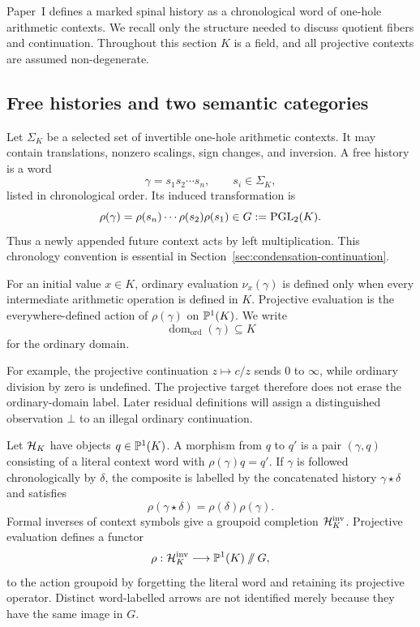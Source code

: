 Paper~I defines a marked spinal history as a chronological word of one-hole
arithmetic contexts.  We recall only the structure needed to discuss quotient
fibers and continuation.  Throughout this section $K$ is a field, and all
projective contexts are assumed non-degenerate.

\subsection{Free histories and two semantic categories}

Let $\Sigma_K$ be a selected set of invertible one-hole arithmetic contexts.
It may contain translations, nonzero scalings, sign changes, and inversion.
A free history is a word
\[
  \gamma=s_1s_2\cdots s_n,
  \qquad s_i\in\Sigma_K,
\]
listed in chronological order.  Its induced transformation is
\begin{equation}
  \rho(\gamma)=\rho(s_n)\cdots\rho(s_2)\rho(s_1)
  \in G:=\operatorname{PGL}_2(K).
  \label{eq:chronological-evaluation}
\end{equation}
Thus a newly appended future context acts by left multiplication.  This
chronology convention is essential in Section~\ref{sec:condensation-continuation}.

\begin{definition}
For an initial value $x\in K$, ordinary evaluation $\nu_x(\gamma)$ is defined
only when every intermediate arithmetic operation is defined in $K$.
Projective evaluation is the everywhere-defined action of $\rho(\gamma)$ on
$\mathbb{P}^1(K)$.  We write
\[
  \operatorname{dom}_{\mathrm{ord}}(\gamma)\subseteq K
\]
for the ordinary domain.
\end{definition}

For example, the projective continuation $z\mapsto c/z$ sends $0$ to
$\infty$, while ordinary division by zero is undefined.  The projective target
therefore does not erase the ordinary-domain label.  Later residual definitions
will assign a distinguished observation $\bot$ to an illegal ordinary
continuation.

\begin{definition}
Let $\mathcal H_K$ have objects $q\in\mathbb{P}^1(K)$.  A morphism from $q$ to $q'$ is a
pair $(\gamma,q)$ consisting of a literal context word with
$\rho(\gamma)q=q'$.  If $\gamma$ is followed chronologically by $\delta$,
the composite is labelled by the concatenated history $\gamma\star\delta$
and satisfies
\[
  \rho(\gamma\star\delta)=\rho(\delta)\rho(\gamma).
\]
Formal inverses of context symbols give a groupoid completion
$\mathcal H_K^{\mathrm{inv}}$.  Projective evaluation defines a functor
\[
  \rho:\mathcal H_K^{\mathrm{inv}}
  \longrightarrow
  \mathbb{P}^1(K)\mathbin{/\mkern-6mu/} G,
\]
to the action groupoid by forgetting the literal word and retaining its
projective operator.  Distinct word-labelled arrows are not identified merely
because they have the same image in $G$.
\end{definition}

